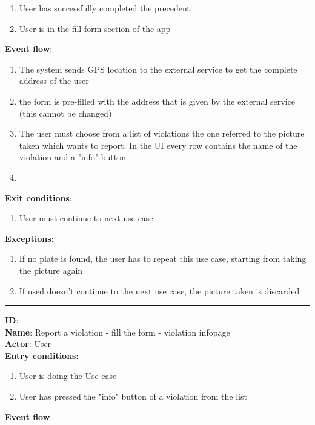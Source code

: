 \begin{enumerate}
\begin{itemize}
\begin{enumerate}
      \item{User has successfully completed the precedent }
      \item{User is in the fill-form section of the app}
    \end{enumerate}
    \textbf{Event flow}:
    \begin{enumerate}
      \item{The system sends GPS location to the external service to get the complete address of the user}
      \item{the form is pre-filled with the address that is given by the external service (this cannot be changed) }
      \item{The user must choose from a list of violations the one referred to the picture taken which wants to report. In the UI every row contains the name of the violation and a "info" button}
      \item 
    \end{enumerate}
    \textbf{Exit conditions}:
    \begin{enumerate}
      \item{User must continue to next use case \ucas{} }
    \end{enumerate}
    \textbf{Exceptions}:
    \begin{enumerate}
      \item{If no plate is found, the user has to repeat this use case, starting from taking the picture again}
      \item{If used doesn't continue to the next use case, the picture taken is discarded}
    \end{enumerate}
    \rule{\linewidth}{0.4pt}

    \textbf{ID}:  \\
    \textbf{Name}: Report a violation - fill the form - violation infopage \\
    \textbf{Actor}: User   \\
    \textbf{Entry conditions}:
    \begin{enumerate}
      \item{User is doing the Use case  }
      \item{User has pressed the "info" button of a violation from the list }
    \end{enumerate}
    \textbf{Event flow}:
    \begin{enumerate}


\end{enumerate}
\end{itemize}
\end{enumerate}
